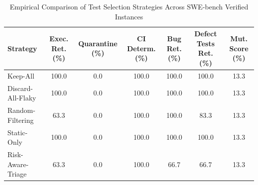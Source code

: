 \begin{table}[t]
\centering
\caption{Empirical Comparison of Test Selection Strategies Across SWE-bench Verified Instances}
\label{tab:strategy_comparison}
\begin{tabular}{lcccccc}
\toprule
\textbf{Strategy} & \textbf{Exec. Ret. (\%)} & \textbf{Quarantine (\%)} & \textbf{CI Determ. (\%)} & \textbf{Bug Ret. (\%)} & \textbf{Defect Tests Ret. (\%)} & \textbf{Mut. Score (\%)} \\
\midrule
Keep-All & 100.0 & 0.0 & 100.0 & 100.0 & 100.0 & 13.3 \\
Discard-All-Flaky & 100.0 & 0.0 & 100.0 & 100.0 & 100.0 & 13.3 \\
Random-Filtering & 63.3 & 0.0 & 100.0 & 100.0 & 83.3 & 13.3 \\
Static-Only & 100.0 & 0.0 & 100.0 & 100.0 & 100.0 & 13.3 \\
Risk-Aware-Triage & 63.3 & 0.0 & 100.0 & 66.7 & 66.7 & 13.3 \\
\bottomrule
\end{tabular}
\end{table}